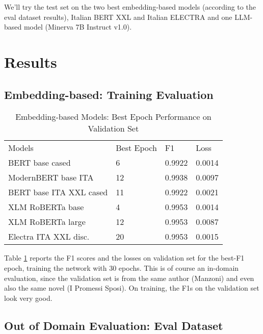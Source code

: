 \documentclass[11pt]{article}
\begin{document}
We'll try the test set on the two best embedding-based models
(according to the eval dataset results), Italian BERT XXL and Italian ELECTRA and
one LLM-based model (Minerva 7B Instruct v1.0).

\section{Results}

\subsection{Embedding-based: Training Evaluation}

\begin{table}[]
	\small
	\caption{Embedding-based Models: Best Epoch Performance on Validation Set}
	\begin{tabular}{llll}
		Models & Best Epoch & F1 & Loss \\
		BERT base cased & 6      & 0.9922        & 0.0014                  \\
		ModernBERT base ITA  & 12      & 0.9938        & 0.0097                  \\
		BERT base ITA XXL cased & 11      & 0.9922        & 0.0021                 \\
		XLM RoBERTa base & 4       & 0.9953        & 0.0014                  \\
		XLM RoBERTa large & 12       & 0.9953       & 0.0087                 \\
		Electra ITA XXL disc. & 20       & 0.9953        & 0.0015                \\
	\end{tabular}
	\label{t1}
\end{table}

Table \ref{t1} reports the F1 scores and the losses on validation set 
for the best-F1 epoch, training the network with 30 epochs.
This is of course an in-domain evaluation, since the validation set
is from the same author (Manzoni) and even also the same novel
(I Promessi Sposi).
On training, the F1s on the validation set look very good.

\subsection{Out of Domain Evaluation: Eval Dataset}
\end{document}
